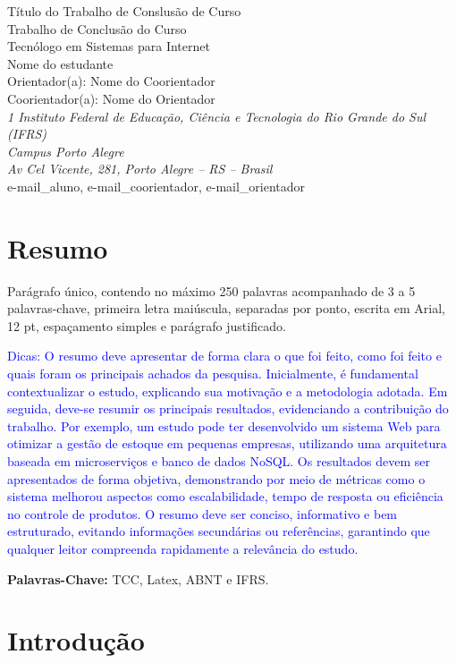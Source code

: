 \documentclass[
	article,			%
	11pt,				%
	oneside,			%
	a4paper,			%
	english,			%
	brazil,				%
	sumario=tradicional
]{abntex2}
\begin{document}
\begin{center}
    {\LARGE Título do Trabalho de Conslusão de Curso}\\[0.8cm]
    {\large Trabalho de Conclusão do Curso}\\
    {\large Tecnólogo em Sistemas para Internet}\\[1cm]
    {\large Nome do estudante}\\
    Orientador(a): Nome do Coorientador\\
    Coorientador(a): Nome do Orientador\\[0.8cm]
    \textit{1 Instituto Federal de Educação, Ciência e Tecnologia do Rio
    Grande do Sul (IFRS)\\
    Campus Porto Alegre\\
    Av Cel Vicente, 281, Porto Alegre – RS – Brasil}\\
    e-mail\_aluno, e-mail\_coorientador, e-mail\_orientador
\end{center}

\section*{Resumo}
Parágrafo único, contendo no máximo 250 palavras acompanhado de 3 a 5
palavras-chave, primeira letra maiúscula, separadas por ponto, escrita em
Arial, 12 pt, espaçamento simples e parágrafo justificado.

\textcolor{blue}{
Dicas: O resumo deve apresentar de forma clara o que foi feito, como foi feito e
quais foram os principais achados da pesquisa. Inicialmente, é fundamental
contextualizar o estudo, explicando sua motivação e a metodologia adotada. Em
seguida, deve-se resumir os principais resultados, evidenciando a contribuição
do trabalho. Por exemplo, um estudo pode ter desenvolvido um sistema Web para
otimizar a gestão de estoque em pequenas empresas, utilizando uma arquitetura
baseada em microserviços e banco de dados NoSQL. Os resultados devem ser
apresentados de forma objetiva, demonstrando por meio de métricas como o sistema
melhorou aspectos como escalabilidade, tempo de resposta ou eficiência no
controle de produtos. O resumo deve ser conciso, informativo e bem estruturado,
evitando informações secundárias ou referências, garantindo que qualquer leitor
compreenda rapidamente a relevância do estudo.
}

\noindent\textbf{Palavras-Chave:} TCC, Latex, ABNT e IFRS.

\section{Introdução}
\end{document}
